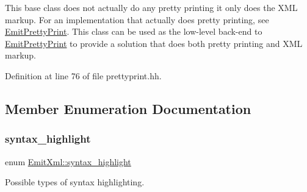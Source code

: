 This base class does not actually do any pretty printing it only does the X\+ML markup. For an implementation that actually does pretty printing, see \mbox{\hyperlink{class_emit_pretty_print}{Emit\+Pretty\+Print}}. This class can be used as the low-\/level back-\/end to \mbox{\hyperlink{class_emit_pretty_print}{Emit\+Pretty\+Print}} to provide a solution that does both pretty printing and X\+ML markup. 

Definition at line 76 of file prettyprint.\+hh.



\subsection{Member Enumeration Documentation}
\mbox{\label{class_emit_xml_a7c3577436da429c3c75f4b82cac6864f}} 
\subsubsection{\texorpdfstring{syntax\_highlight}{syntax\_highlight}}
{\footnotesize\ttfamily enum \mbox{\hyperlink{class_emit_xml_a7c3577436da429c3c75f4b82cac6864f}{Emit\+Xml\+::syntax\+\_\+highlight}}}



Possible types of syntax highlighting. 


